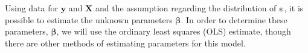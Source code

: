 Using data for $\textbf{y}$ and $\textbf{X}$ and the assumption regarding the distribution of $\boldsymbol{\varepsilon}$, it is possible to estimate the unknown parameters $\boldsymbol{\beta}$. 
In order to determine these parameters, $\boldsymbol{\beta}$, we will use the ordinary least squares (OLS) estimate, though there are other methods of estimating parameters for this model.